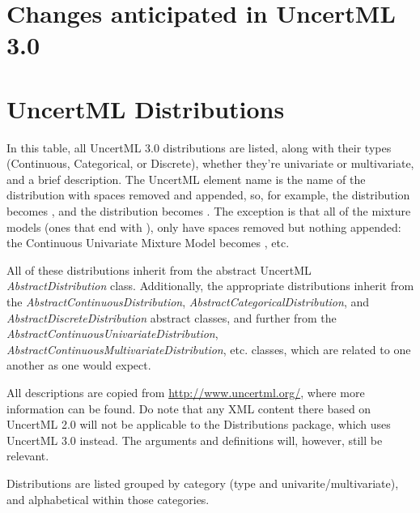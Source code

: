 \documentclass[draftspec]{sbmlpkgspec}
\newcommand{\distrib}{Distributions\xspace}
\begin{document}
\appendix
\section{Changes anticipated in UncertML 3.0}


\section{UncertML Distributions}
\label{sec:uncertml-distributions}

\begin{blockChanged}
In this table, all UncertML 3.0 distributions are listed, along with their types (Continuous, Categorical, or Discrete), whether they're univariate or multivariate, and a brief description.  The UncertML element name is the name of the distribution with spaces removed and  appended, so, for example, the  distribution becomes , and the  distribution becomes .  The exception is that all of the mixture models (ones that end with ), only have spaces removed but nothing appended:  the Continuous Univariate Mixture Model becomes , etc.

All of these distributions inherit from the abstract UncertML \emph{AbstractDistribution} class.  Additionally, the appropriate distributions inherit from the \emph{AbstractContinuousDistribution}, \emph{AbstractCategoricalDistribution}, and \emph{AbstractDiscreteDistribution} abstract classes, and further from the \emph{AbstractContinuousUnivariateDistribution}, \emph{AbstractContinuousMultivariateDistribution}, etc. classes, which are related to one another as one would expect.

All descriptions are copied from \url{http://www.uncertml.org/}, where more information can be found.  Do note that any XML content there based on UncertML 2.0 will not be applicable to the \distrib package, which uses UncertML 3.0 instead.  The arguments and definitions will, however, still be relevant.

Distributions are listed grouped by category (type and univarite/multivariate), and alphabetical within those categories.


\end{blockChanged}
\end{document}
